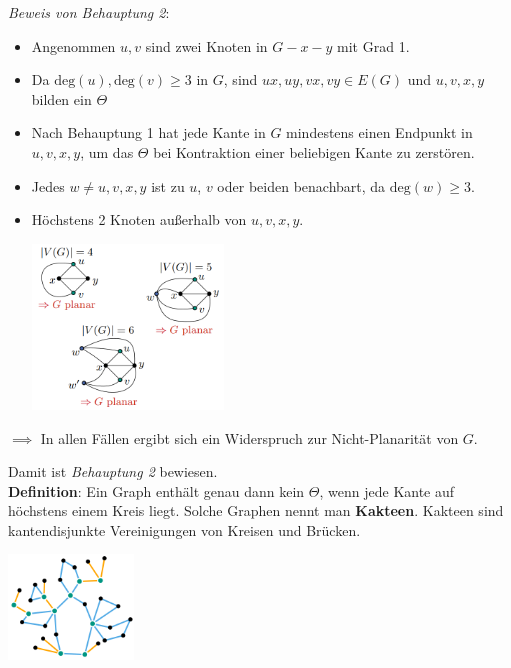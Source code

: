 \textit{Beweis von Behauptung 2}: 
\begin{itemize}
	\item Angenommen $u,v$ sind zwei Knoten in $G-x-y$ mit Grad 1.
	\item Da $\text{deg}(u),\text{deg}(v)\geq 3$ in $G$, sind $ux, uy, vx, vy \in E(G)$ und $u,v,x,y$ bilden ein $\Theta$
	\item Nach Behauptung 1 hat jede Kante in $G$ mindestens einen Endpunkt in $u, v, x, y$, um das $\Theta$ bei Kontraktion einer beliebigen Kante zu zerstören.
	\item Jedes $w\neq u, v, x, y$ ist zu $u$, $v$ oder beiden benachbart, da $\text{deg}(w)\geq 3$.
	\item Höchstens 2 Knoten außerhalb von $u, v, x, y$.
	\begin{center}
		\includegraphics[width=0.4\textwidth]{images/wagner-8.png}
	\end{center}
\end{itemize}

$\implies$ In allen Fällen ergibt sich ein Widerspruch zur Nicht-Planarität von $G$.

Damit ist \textit{Behauptung 2} bewiesen.\\

\textbf{Definition}: Ein Graph enthält genau dann kein $\Theta$, wenn jede Kante auf höchstens einem Kreis liegt. Solche Graphen nennt man \textbf{Kakteen}. Kakteen sind kantendisjunkte Vereinigungen von Kreisen und Brücken.
\begin{center}
	\includegraphics[width=0.25\textwidth]{images/kaktus.png}
\end{center}

